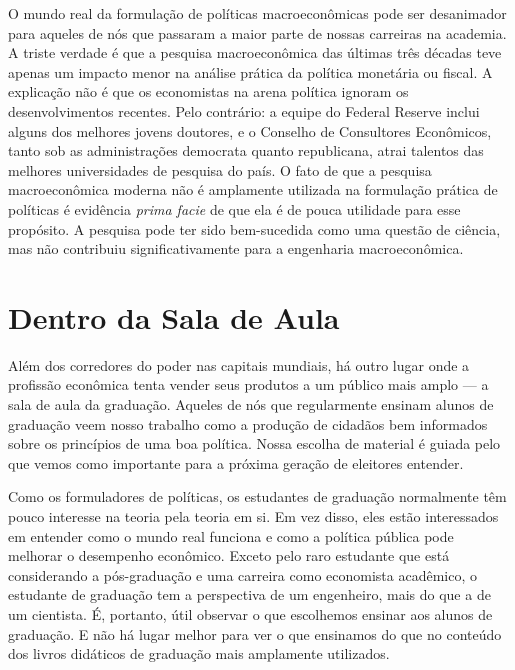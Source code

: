 \documentclass[12pt]{article}
\begin{document}
O mundo real da formulação de políticas macroeconômicas pode ser desanimador para aqueles de nós que passaram a maior parte de nossas carreiras na academia. A triste verdade é que a pesquisa macroeconômica das últimas três décadas teve apenas um impacto menor na análise prática da política monetária ou fiscal. A explicação não é que os economistas na arena política ignoram os desenvolvimentos recentes. Pelo contrário: a equipe do Federal Reserve inclui alguns dos melhores jovens doutores, e o Conselho de Consultores Econômicos, tanto sob as administrações democrata quanto republicana, atrai talentos das melhores universidades de pesquisa do país. O fato de que a pesquisa macroeconômica moderna não é amplamente utilizada na formulação prática de políticas é evidência \textit{prima facie} de que ela é de pouca utilidade para esse propósito. A pesquisa pode ter sido bem-sucedida como uma questão de ciência, mas não contribuiu significativamente para a engenharia macroeconômica.

\section{Dentro da Sala de Aula}

Além dos corredores do poder nas capitais mundiais, há outro lugar onde a profissão econômica tenta vender seus produtos a um público mais amplo — a sala de aula da graduação. Aqueles de nós que regularmente ensinam alunos de graduação veem nosso trabalho como a produção de cidadãos bem informados sobre os princípios de uma boa política. Nossa escolha de material é guiada pelo que vemos como importante para a próxima geração de eleitores entender.

Como os formuladores de políticas, os estudantes de graduação normalmente têm pouco interesse na teoria pela teoria em si. Em vez disso, eles estão interessados em entender como o mundo real funciona e como a política pública pode melhorar o desempenho econômico. Exceto pelo raro estudante que está considerando a pós-graduação e uma carreira como economista acadêmico, o estudante de graduação tem a perspectiva de um engenheiro, mais do que a de um cientista. É, portanto, útil observar o que escolhemos ensinar aos alunos de graduação. E não há lugar melhor para ver o que ensinamos do que no conteúdo dos livros didáticos de graduação mais amplamente utilizados.
\end{document}
